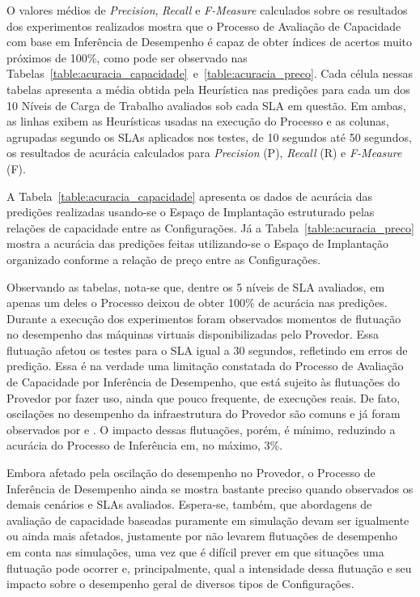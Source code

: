 O valores médios de \emph{Precision}, \emph{Recall} e \emph{F-Measure}
calculados sobre os resultados dos experimentos realizados mostra que o Processo 
de Avaliação de Capacidade com base em Inferência de Desempenho é capaz de obter 
índices de acertos muito próximos de 100\%, como pode ser observado nas 
Tabelas~\ref{table:acuracia_capacidade}~e~\ref{table:acuracia_preco}. Cada célula 
nessas tabelas apresenta a média obtida pela Heurística nas predições para cada 
um dos 10 Níveis de Carga de Trabalho avaliados sob cada SLA em questão. Em ambas, 
as linhas exibem as Heurísticas usadas na execução do Processo e as colunas, 
agrupadas segundo os SLAs aplicados nos testes, de 10 segundos até 50 segundos, 
os resultados de acurácia calculados para \emph{Precision} (P), \emph{Recall} (R) 
e \emph{F-Measure} (F).

A Tabela~\ref{table:acuracia_capacidade} apresenta os dados de acurácia das 
predições realizadas usando-se o Espaço de Implantação estruturado pelas relações
de capacidade entre as Configurações. Já a Tabela~\ref{table:acuracia_preco} mostra
a acurácia das predições feitas utilizando-se o Espaço de Implantação organizado
conforme a relação de preço entre as Configurações. 

Observando as tabelas, nota-se que, dentre os 5 níveis de SLA avaliados, em apenas 
um deles o Processo deixou de obter 100\% de acurácia nas predições. Durante a
execução dos experimentos foram observados momentos de flutuação no desempenho
das máquinas virtuais disponibilizadas pelo Provedor. Essa flutuação afetou os
testes para o SLA igual a 30 segundos, refletindo em erros de predição. Essa é
na verdade uma limitação constatada do Processo de Avaliação de Capacidade por
Inferência de Desempenho, que está sujeito às flutuações do Provedor por fazer
uso, ainda que pouco frequente, de execuções reais. De fato, oscilações no 
desempenho da infraestrutura do Provedor são comuns e já foram observados por 
\cite{iosup2011performance} e \cite{cunhaavalia}. O impacto dessas flutuações, 
porém, é mínimo, reduzindo a acurácia do Processo de Inferência em, no máximo,
3\%.

Embora afetado pela oscilação do desempenho no Provedor, o Processo de Inferência
de Desempenho ainda se mostra bastante preciso quando observados os demais 
cenários e SLAs avaliados. Espera-se, também, que abordagens de avaliação de
capacidade baseadas puramente em simulação devam ser igualmente ou ainda mais 
afetados, justamente por não levarem flutuações de desempenho em conta nas 
simulações, uma vez que é difícil prever em que situações uma flutuação pode 
ocorrer e, principalmente, qual a intensidade dessa flutuação e seu impacto sobre 
o desempenho geral de diversos tipos de Configurações.   

